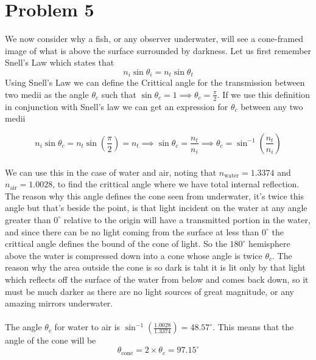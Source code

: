 \section*{Problem 5}

We now consider why a fish, or any observer underwater, will see a cone-framed image of what is above the
surface surrounded by darkness. Let us first remember Snell's Law which states that 
$$n_i\sin\theta_i = n_t\sin\theta_t$$
Using Snell's Law we can define the Crittical angle for the transmission between two medii as the angle 
$\theta_c$ such that $\sin\theta_c = 1 \implies \theta_c = \frac{\pi}{2}$. If we use this definition in
conjunction with Snell's law we can get an expression for $\theta_c$ between any two medii

\begin{equation*}
	n_i\sin\theta_c = n_t\sin(\frac{\pi}{2}) = n_t 
	\implies \sin\theta_c = \frac{n_t}{n_i} 
	\implies \theta_c = \sin^{-1}\left(\frac{n_t}{n_i} \right)
\end{equation*}
\\
We can use this in the case of water and air, noting that $n_{\mathrm{water}} = 1.3374$ and 
$n_{\mathrm{air}} = 1.0028$, to find the crittical angle where we have total internal reflection. The reason
why this angle defines the cone seen from underwater, it's twice this angle but that's beside the point, is
that light incident on the water at any angle greater than $0^\circ$ relative to the origin will have
a transmitted portion in the water, and since there can be no light coming from the surface at less than 
$0^\circ$ the crittical angle defines the bound of the cone of light. So the $180^\circ$ hemisphere above the
water is compressed down into a cone whose angle is twice $\theta_c$. The reason why the area outside the 
cone is so dark is taht it is lit only by that light which reflects off the surface of the water from below and
comes back down, so it must be much darker as there are no light sources of great magnitude, or any amazing mirrors underwater. 
\\
\\
The angle $\theta_c$ for water to air is $\sin^{-1}\left(\frac{1.0028}{1.3374}\right) = 48.57^\circ$. This
means that the angle of the cone will be 
$$\theta_{\mathrm{cone}} = 2 \times \theta_c = 97.15^\circ$$

